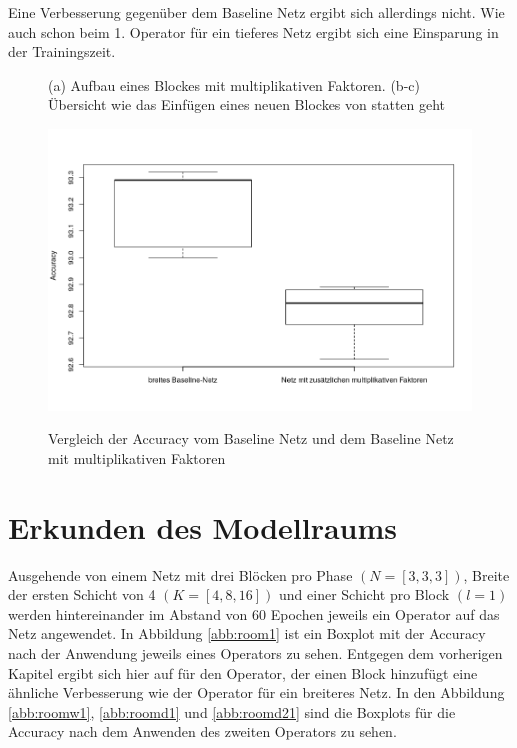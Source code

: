 Eine Verbesserung gegenüber dem Baseline Netz ergibt sich allerdings nicht. Wie auch schon beim 1. Operator für ein tieferes Netz ergibt sich eine Einsparung in der Trainingszeit.


\begin{figure}
     \centering
     \subfloat[][]{}     
     \subfloat[][]{}
     \subfloat[][Diagramm 3]{}
     \caption{(a) Aufbau eines Blockes mit multiplikativen Faktoren. (b-c) Übersicht wie das Einfügen eines neuen Blockes von statten geht}
     \label{abb:diagramm}
\end{figure}


\begin{figure}[]
     \centering
     \includegraphics[width= .65\textwidth]{KapitelPartB/Images/baselineMul1.png}\label{abb:BaselineMul1}
     \caption{Vergleich der Accuracy vom Baseline Netz und dem Baseline Netz mit multiplikativen Faktoren}
     \label{abb:BaselineMul}
\end{figure}






\section{Erkunden des Modellraums}
Ausgehende von einem Netz mit drei Blöcken pro Phase $(N=[3,3,3])$, Breite der ersten Schicht von 4 $(K=[4,8,16])$ und einer Schicht pro Block $(l=1)$ werden hintereinander im Abstand von 60 Epochen jeweils ein Operator auf das Netz angewendet. In Abbildung \ref{abb:room1} ist ein Boxplot mit der Accuracy nach der Anwendung jeweils eines Operators zu sehen. Entgegen dem vorherigen Kapitel ergibt sich hier auf für den Operator, der einen Block hinzufügt eine ähnliche Verbesserung wie der Operator für ein breiteres Netz. In den Abbildung \ref{abb:roomw1}, \ref{abb:roomd1} und \ref{abb:roomd21} sind die Boxplots für die Accuracy nach dem Anwenden des zweiten Operators zu sehen. 

